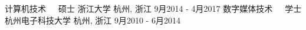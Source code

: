 


\begin{cventries}


\cventrynew
{计算机技术~~~硕士} %
{浙江大学} %
{杭州, 浙江} %
{9月2014 - 4月2017} %
\cventrynew
{数字媒体技术~~~学士} %
{杭州电子科技大学} %
{杭州, 浙江} %
{9月2010 - 6月2014} %


\end{cventries}